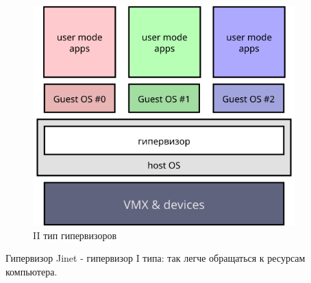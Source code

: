 \documentclass[a4paper,12pt]{extarticle}
\begin{document}
\begin{itemize}
\begin{figure}[htb]
\begin{minipage}{0.45\textwidth}
				\includegraphics[width=0.9\textwidth]{../diagrams/hyper_type2}
				\caption{II тип гипервизоров}
				\label{fig:hypertype2}
			\end{minipage}
		\end{figure}
		Гипервизор Jinet - гипервизор I типа: так легче обращаться к ресурсам компьютера.
	\end{itemize}
\end{document}
